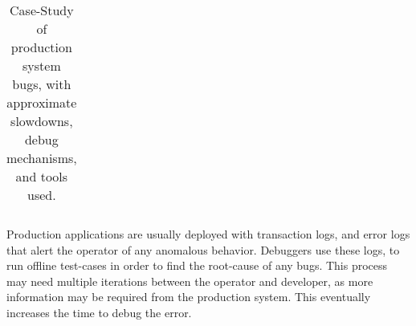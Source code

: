 \begin{table*}[ht!]
\begin{tabular}{|c|c|c|c|c|c|c|c|}
\end{tabular}\caption{Case-Study of production system bugs, with approximate slowdowns, debug mechanisms, and tools used.}
\label{table:casestudy}
\end{table*}
\fi


Production applications are usually deployed with transaction logs, and error logs that alert the operator of any anomalous behavior.
Debuggers use these logs, to run offline test-cases in order to find the root-cause of any bugs. 
This process may need multiple iterations between the operator and developer, as more information may be required from the production system. This eventually increases the time to debug the error.

